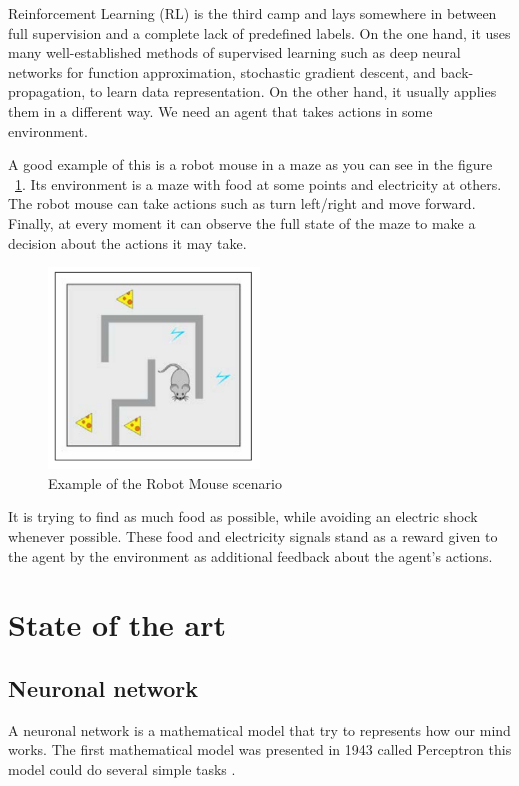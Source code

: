 Reinforcement Learning (RL) is the third camp and lays somewhere in between full supervision and a complete lack of predefined labels. On the one hand, it uses many well-established methods of supervised learning such as deep neural networks for function approximation, stochastic gradient descent, and back-propagation, to learn data representation.
On the other hand, it usually applies them in a different way. We need an agent that takes actions in some environment.

A good example of this is a robot mouse in a maze as you can see in the figure ~\ref{fig:maze}. Its environment is a maze with food at some points and electricity at others. 
The robot mouse can take actions such as turn left/right and move forward. Finally, at every moment it can observe the full state of the maze to make a 
decision about the actions it may take.
\begin{figure}[H]
\centering
\includegraphics[width=0.5\textwidth]{./figures/robotmouse-maze}
\caption{Example of the Robot Mouse scenario \cite{reinforcement-learning}}
\label{fig:maze}
\end{figure}
It is trying to find as much food as  possible, while avoiding an electric shock whenever possible. These food and electricity signals stand as a reward given to the agent by the environment as additional feedback about the agent's actions.

\newpage
\section{State of the art}
\subsection[Neuronal network]{Neuronal network}

A neuronal network is a mathematical model that try to represents how our mind works. The first mathematical model was presented in 1943 called Perceptron this model could do several simple tasks \cite{fsancho}.

